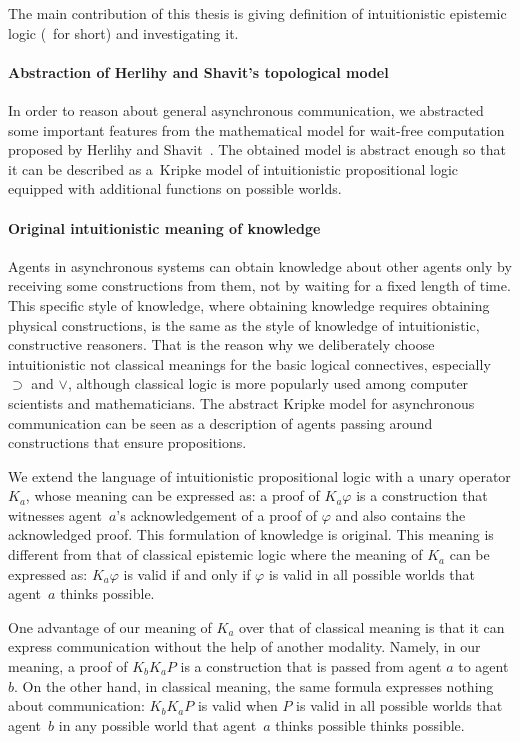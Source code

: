The main contribution of this thesis is giving definition of
intuitionistic epistemic logic (\iec\, for short) and investigating it.

\paragraph{Abstraction of Herlihy and Shavit's topological model}
In order
to reason about general asynchronous communication,
we abstracted some important features from the mathematical model for wait-free
computation proposed by Herlihy and Shavit~\cite{herlihy1999topological}.
The obtained model is abstract enough so that it can be described as a~Kripke model of
intuitionistic propositional logic equipped with additional functions on possible worlds.


\paragraph{Original intuitionistic meaning of knowledge}
 Agents in asynchronous systems can
 obtain knowledge about other agents only by receiving some constructions from them,
 not by waiting for a fixed length of time.
 This specific style of knowledge, where
 obtaining knowledge requires obtaining physical constructions,
 is the same as the style of knowledge of intuitionistic, constructive reasoners.
 That is the reason why we deliberately choose intuitionistic not classical meanings for
 the basic logical connectives, especially $\supset$ and $\vee$, although classical logic
 is more popularly used among computer scientists and mathematicians.
 The abstract Kripke model for asynchronous communication
 can be seen as a description of agents passing around constructions that ensure
 propositions.

 We extend the language of intuitionistic propositional logic with a unary operator $K_a$,
 whose meaning can be expressed as:
 a proof of $K_a\varphi$ is a construction that witnesses agent~$a$'s
 acknowledgement of a proof of $\varphi$ and also contains the acknowledged
 proof.  This formulation of knowledge is original.
 This meaning is different from that of classical epistemic logic where
 the meaning of $K_a$ can be expressed as:
 $K_a\varphi$ is valid if and only if $\varphi$ is valid in all possible worlds
 that agent~$a$ thinks possible.

 One advantage of our meaning of $K_a$ over that of classical meaning is that
 it can express communication without the help of another modality.
 Namely, in our meaning,
 a proof of $K_bK_a P$ is a construction that is passed from agent $a$ to agent
 $b$.
 On the other hand, in classical meaning, the same formula expresses nothing about
 communication:
 $K_b K_a P$ is valid when $P$ is valid in all possible worlds that agent~$b$ in any
 possible world that agent~$a$ thinks possible thinks possible.

